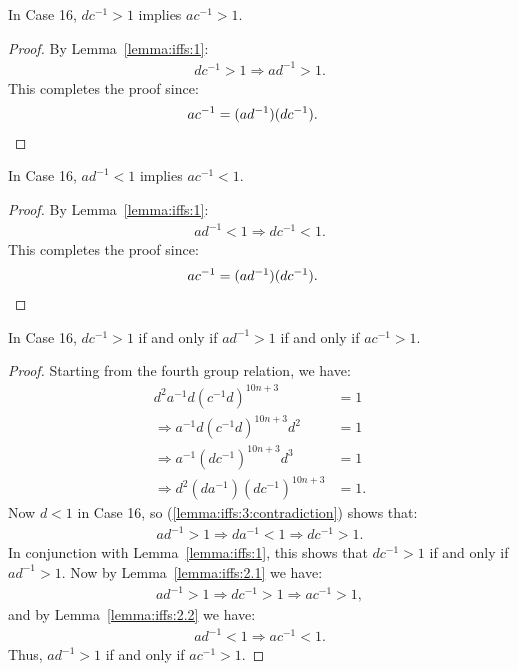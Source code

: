 \begin{lemma} In Case 16, $dc^{-1}>1$ implies $ac^{-1}>1$.
\label{lemma:iffs:2.1}
\end{lemma}
\begin{proof}
By Lemma~\ref{lemma:iffs:1}:
\begin{align*}
dc^{-1}>1 \Rightarrow{} ad^{-1}>1.
\end{align*}
This completes the proof since:
\begin{align*}
ac^{-1}&=(ad^{-1})(dc^{-1}).\qedhere
\end{align*}
\end{proof}

\begin{lemma} In Case 16, $ad^{-1}<1$ implies $ac^{-1}<1$.
\label{lemma:iffs:2.2}
\end{lemma}
\begin{proof}
By Lemma~\ref{lemma:iffs:1}:
\begin{align*}
ad^{-1}<1 \Rightarrow{} dc^{-1}<1.
\end{align*}
This completes the proof since:
\begin{align*}
ac^{-1}&=(ad^{-1})(dc^{-1}).\qedhere
\end{align*}
\end{proof}

\begin{corollary} In Case 16, $dc^{-1}>1$ if and only if $ad^{-1}>1$ if and only if $ac^{-1}>1$.
\label{lemma:iffs:3}
\end{corollary}
\begin{proof}
Starting from the fourth group relation, we have:
\begin{align}
d^{2}a^{-1}d(c^{-1}d)^{10n+3}&=1\nonumber{}\\
\Rightarrow{}a^{-1}d(c^{-1}d)^{10n+3}d^{2}&=1\nonumber{}\\
\Rightarrow{}a^{-1}(dc^{-1})^{10n+3}d^{3}&=1\nonumber{}\\
\Rightarrow{}d^{2}(da^{-1})(dc^{-1})^{10n+3}&=1.\label{lemma:iffs:3:contradiction}
\end{align}
Now $d<1$ in Case 16, so (\ref{lemma:iffs:3:contradiction}) shows that:
\begin{align*}
ad^{-1}>1\Rightarrow{}da^{-1}<1\Rightarrow{}dc^{-1}>1.
\end{align*}
In conjunction with Lemma~\ref{lemma:iffs:1}, this shows that $dc^{-1}>1$ if and only if $ad^{-1}>1$. Now by Lemma~\ref{lemma:iffs:2.1} we have:
\begin{align*}
ad^{-1}>1\Rightarrow{}dc^{-1}>1\Rightarrow{}ac^{-1}>1,
\end{align*}
and by Lemma~\ref{lemma:iffs:2.2} we have:
\begin{align*}
ad^{-1}<1\Rightarrow{}ac^{-1}<1.
\end{align*}
Thus, $ad^{-1}>1$ if and only if $ac^{-1}>1$.
\end{proof}

